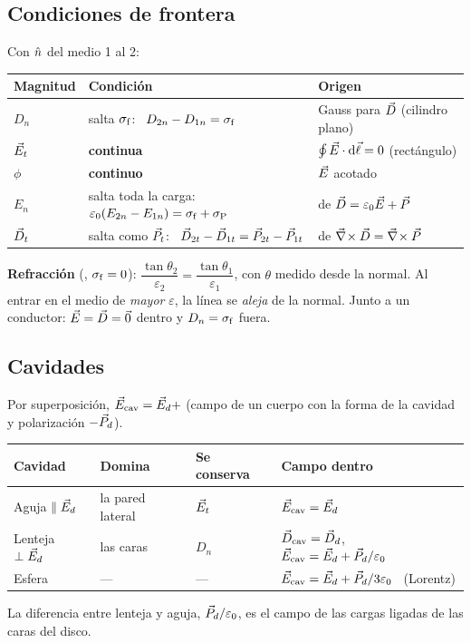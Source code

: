 \subsection{Condiciones de frontera}

Con $\hat n$ del medio 1 al 2:
\begin{center}
\small
\begin{tabular}{@{}lll@{}}
\toprule
Magnitud & Condición & Origen\\
\midrule
$D_n$ & salta $\sigma_{\mathrm f}$: \ $D_{2n}-D_{1n}=\sigma_{\mathrm f}$ & Gauss para $\vec D$ (cilindro plano)\\
$\vec E_t$ & \textbf{continua} & $\oint\vec E\cdot\mathop{}\!\mathrm{d}\vec\ell=0$ (rectángulo)\\
$\phi$ & \textbf{continuo} & $\vec E$ acotado\\
$E_n$ & salta toda la carga: \ $\varepsilon_0(E_{2n}-E_{1n})=\sigma_{\mathrm f}+\sigma_{\mathrm P}$ & de $\vec D=\varepsilon_0\vec E+\vec P$\\
$\vec D_t$ & salta como $\vec P_t$: \ $\vec D_{2t}-\vec D_{1t}=\vec P_{2t}-\vec P_{1t}$ & de $\vec\nabla\!\times\vec D=\vec\nabla\!\times\vec P$\\
\bottomrule
\end{tabular}
\end{center}
\textbf{Refracción} (\LHI{}, $\sigma_{\mathrm f}=0$): $\dfrac{\tan\theta_2}{\varepsilon_2}=\dfrac{\tan\theta_1}{\varepsilon_1}$, con $\theta$ medido desde la normal. Al entrar
en el medio de \emph{mayor} $\varepsilon$, la línea se \emph{aleja} de la normal. Junto a un conductor: $\vec E=\vec D=\vec 0$ dentro y $D_n=\sigma_{\mathrm f}$ fuera.

\subsection{Cavidades}

Por superposición, $\vec E_{\mathrm{cav}}=\vec E_d+$ (campo de un cuerpo con la forma de la cavidad y polarización $-\vec P_d$).
\begin{center}
\small
\begin{tabular}{@{}llll@{}}
\toprule
Cavidad & Domina & Se conserva & Campo dentro\\
\midrule
Aguja $\parallel\vec E_d$ & la pared lateral & $\vec E_t$ & $\vec E_{\mathrm{cav}}=\vec E_d$\\
Lenteja $\perp\vec E_d$ & las caras & $D_n$ & $\vec D_{\mathrm{cav}}=\vec D_d$, \ $\vec E_{\mathrm{cav}}=\vec E_d+\vec P_d/\varepsilon_0$\\
Esfera & --- & --- & $\vec E_{\mathrm{cav}}=\vec E_d+\vec P_d/3\varepsilon_0$ \ (Lorentz)\\
\bottomrule
\end{tabular}
\end{center}
La diferencia entre lenteja y aguja, $\vec P_d/\varepsilon_0$, es el campo de las cargas ligadas de las caras del disco.

